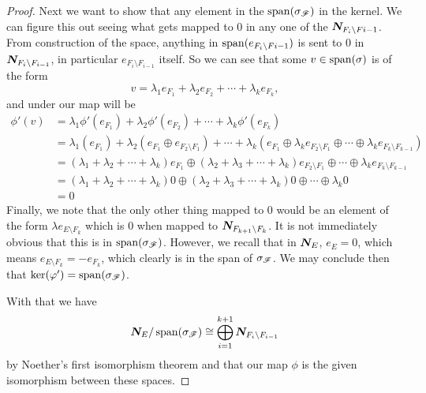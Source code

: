 \documentclass[12pt,oneside]{../../sfsuthesis}
\begin{document}
\begin{proof}
    Next we want to show that any element in the \( \operatorname{span}(\sigma_{\mathscr{F}}) \) in the kernel.
    We can figure this out seeing what gets mapped to 0 in any one of the \( \bm{N}_{F_i \setminus F i-1} \).
    From construction of the space, anything in \( \operatorname{span}( e_{F_i \setminus F{i-1}}) \) is sent to 0 in \( \bm{N}_{F_i \setminus F_{i-1}} \), in particular \( e_{F_i \setminus F_{i-1}} \) itself.
    So we can see that some \( v \in \operatorname{span}( \sigma ) \) is of the form
    \[
        v = \lambda_1 e_{F_1} + \lambda_2 e_{F_2} + \cdots + \lambda_k e_{F_k},
    \]
    and under our map will be
    \begin{align*}
        \phi'(v) & = \lambda_1 \phi'(e_{F_1}) + \lambda_2 \phi'(e_{F_2}) + \cdots + \lambda_k \phi'(e_{F_k})                                                                                                                                                 \\
                 & = \lambda_1 \left(e_{F_1}\right) + \lambda_2 \left(e_{F_1} \oplus  e_{F_2 \setminus F_1}\right) + \cdots + \lambda_k \left(e_{F_1} \oplus \lambda_k e_{F_2 \setminus F_1} \oplus \cdots \oplus \lambda_k e_{F_k \setminus F_{k-1}}\right) \\
                 & = (\lambda_1 + \lambda_2 + \cdots + \lambda_k) e_{F_1} \oplus (\lambda_2 + \lambda_3 + \cdots + \lambda_k) e_{F_2 \setminus F_1} \oplus \cdots \oplus \lambda_k e_{F_k \setminus F_{k-1}}                                                 \\
                 & = (\lambda_1 + \lambda_2 + \cdots + \lambda_k) 0 \oplus (\lambda_2 + \lambda_3 + \cdots + \lambda_k) 0 \oplus \cdots \oplus \lambda_k 0                                                                                                   \\
                 & = 0
    \end{align*}
    Finally, we note that the only other thing mapped to 0 would be an element of the form \( \lambda e_{E \setminus F_k} \) which is 0 when mapped to \( \bm{N}_{F_{k+1} \setminus F_k} \).
    It is not immediately obvious that this is in \( \operatorname{span}(\sigma_{\mathscr{F}}) \).
    However, we recall that in \( \bm{N}_E  \), \( e_E = 0 \), which means \( e_{E \setminus F_k} = -e_{F_k} \), which clearly is in the span of \( \sigma_{\mathscr{F}} \).
    We may conclude then that \( \ker( \varphi' ) = \operatorname{span}(\sigma_{\mathscr{F}}) \).

    With that we have
    \[
        \bm{N}_E/ \operatorname{span}(\sigma_{\mathscr{F}}) \cong \bigoplus_{i=1}^{k+1} \bm{N}_{F_i \setminus F_{i-1}}
    \]
    by Noether's first isomorphism theorem and that our map \( \phi \) is the given isomorphism between these spaces.
\end{proof}
\end{document}
